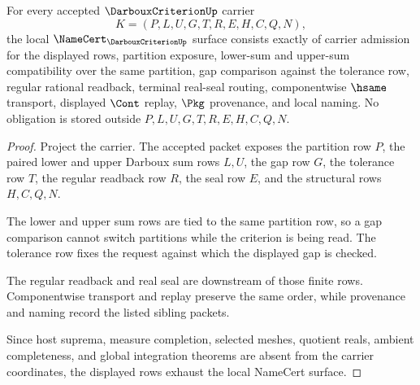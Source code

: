 \begin{theorem}
\label{thm:darboux-criterion-namecert-obligations}
For every accepted $\DarbouxCriterionUp$ carrier
$$
K=(P,L,U,G,T,R,E,H,C,Q,N),
$$
the local $\NameCert_{\DarbouxCriterionUp}$ surface consists exactly of carrier admission for the displayed rows, partition exposure, lower-sum and upper-sum compatibility over the same partition, gap comparison against the tolerance row, regular rational readback, terminal real-seal routing, componentwise $\hsame$ transport, displayed $\Cont$ replay, $\Pkg$ provenance, and local naming. No obligation is stored outside $P,L,U,G,T,R,E,H,C,Q,N$.
\end{theorem}
\begin{proof}
Project the carrier. The accepted packet exposes the partition row $P$, the paired lower and upper Darboux sum rows $L,U$, the gap row $G$, the tolerance row $T$, the regular readback row $R$, the seal row $E$, and the structural rows $H,C,Q,N$.

The lower and upper sum rows are tied to the same partition row, so a gap comparison cannot switch partitions while the criterion is being read. The tolerance row fixes the request against which the displayed gap is checked.

The regular readback and real seal are downstream of those finite rows. Componentwise transport and replay preserve the same order, while provenance and naming record the listed sibling packets.

Since host suprema, measure completion, selected meshes, quotient reals, ambient completeness, and global integration theorems are absent from the carrier coordinates, the displayed rows exhaust the local NameCert surface.
\end{proof}

